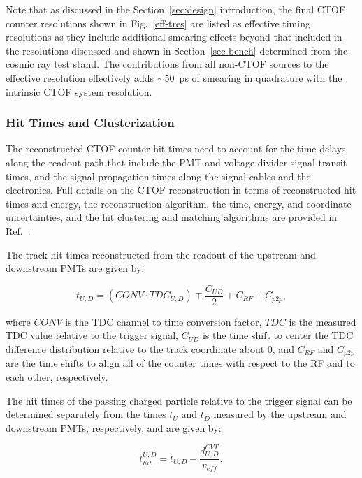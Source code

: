 \documentclass{elsart}
\begin{document}
Note that as discussed in the Section~\ref{sec:design} introduction, the final CTOF counter resolutions
shown in Fig.~\ref{eff-tres} are listed as effective timing resolutions as they include additional smearing
effects beyond that included in the resolutions discussed and shown in Section~\ref{sec-bench} determined
from the cosmic ray test stand. The contributions from all non-CTOF sources to the effective resolution
effectively adds $\sim$50~ps of smearing in quadrature with the intrinsic CTOF system resolution.

\subsubsection{Hit Times and Clusterization}
\label{cluster}

The reconstructed CTOF counter hit times need to account for the time delays along the readout
path that include the PMT and voltage divider signal transit times, and the signal propagation times along
the signal cables and the electronics. Full details on the CTOF reconstruction in terms of reconstructed hit
times and energy, the reconstruction algorithm, the time, energy, and coordinate uncertainties, and
the hit clustering and matching algorithms are provided in Ref.~\cite{ctof-recon}.

The track hit times reconstructed from the readout of the upstream and downstream PMTs are given by:

\begin{equation}
t_{U,D} = (CONV \cdot TDC_{U,D}) \mp \frac{C_{UD}}{2} + C_{RF} + C_{p2p},
\end{equation}

\noindent
where $CONV$ is the TDC channel to time conversion factor, $TDC$ is the measured TDC value relative
to the trigger signal, $C_{UD}$ is the time shift to center the TDC difference distribution relative to the
track coordinate about 0, and $C_{RF}$ and $C_{p2p}$ are the time shifts to align all of the counter times
with respect to the RF and to each other, respectively.

The hit times of the passing charged particle relative to the trigger signal can be determined separately 
from the times $t_U$ and $t_D$ measured by the upstream and downstream PMTs, respectively, and are
given by:

\begin{equation}
t_{hit}^{U,D} = t_{U,D} - \frac{d^{CVT}_{U,D}}{v_{eff}},
\end{equation}
\end{document}
